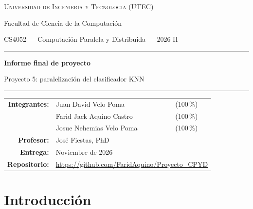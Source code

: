 \documentclass[11pt,a4paper]{article}
\begin{document}
\hypersetup{pageanchor=false}
\begin{titlepage}
\centering
\vspace*{2cm}
{\large\textsc{Universidad de Ingeniería y Tecnología (UTEC)}\par}
{Facultad de Ciencia de la Computación\par}
\vspace{1.5cm}
{CS4052 --- Computación Paralela y Distribuida --- 2026-II\par}
\vspace{1.5cm}
\rule{\textwidth}{0.4pt}\par\vspace{0.4cm}
{\Large\bfseries Informe final de proyecto\par}
\vspace{0.3cm}
{\large Proyecto 5: paralelización del clasificador KNN\par}
\vspace{0.4cm}\rule{\textwidth}{0.4pt}\par
\vspace{1.5cm}
\begin{tabular}{rll}
\textbf{Integrantes:} & Juan David Velo Poma & (100\,\%)\\
                      & Farid Jack Aquino Castro & (100\,\%)\\
                      & Josue Nehemias Velo Poma & (100\,\%)\\[0.3cm]
\textbf{Profesor:}    & José Fiestas, PhD & \\[0.3cm]
\textbf{Entrega:}     & Noviembre de 2026 & \\[0.3cm]
\textbf{Repositorio:} & \multicolumn{2}{l}{\url{https://github.com/FaridAquino/Proyecto_CPYD}}\\
\end{tabular}
\vfill
\end{titlepage}
\hypersetup{pageanchor=true}

\setcounter{tocdepth}{2}
\tableofcontents
\newpage

\section{Introducción}
\end{document}
